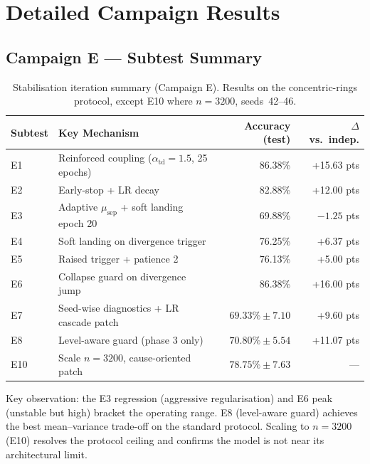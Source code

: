 \documentclass[11pt,a4paper]{article}
\begin{document}
\appendix

\section{Detailed Campaign Results}

\subsection{Campaign E --- Subtest Summary}

\begin{table}[h]
\centering
\begin{tabular}{llrr}
\toprule
\textbf{Subtest} & \textbf{Key Mechanism} & \textbf{Accuracy (test)} & \textbf{$\Delta$ vs.\ indep.} \\
\midrule
E1  & Reinforced coupling ($\alpha_{\mathrm{td}}=1.5$, 25 epochs)  & 86.38\%       & +15.63 pts \\
E2  & Early-stop + LR decay                                         & 82.88\%       & +12.00 pts \\
E3  & Adaptive $\mu_{\mathrm{sep}}$ + soft landing epoch 20         & 69.88\%       & $-1.25$ pts \\
E4  & Soft landing on divergence trigger                            & 76.25\%       & +6.37 pts  \\
E5  & Raised trigger + patience 2                                   & 76.13\%       & +5.00 pts  \\
E6  & Collapse guard on divergence jump                             & 86.38\%       & +16.00 pts \\
E7  & Seed-wise diagnostics + LR cascade patch                      & $69.33\% \pm 7.10$ & +9.60 pts \\
E8  & Level-aware guard (phase 3 only)                              & $70.80\% \pm 5.54$ & +11.07 pts \\
E10 & Scale $n=3200$, cause-oriented patch                          & $78.75\% \pm 7.63$ & --- \\
\bottomrule
\end{tabular}
\caption{Stabilisation iteration summary (Campaign E).  Results on the concentric-rings protocol,
except E10 where $n=3200$, seeds~42--46.}
\label{tab:campaign_e_detail}
\end{table}

Key observation: the E3 regression (aggressive regularisation) and E6 peak (unstable but high)
bracket the operating range.  E8 (level-aware guard) achieves the best mean--variance trade-off
on the standard protocol.  Scaling to $n=3200$ (E10) resolves the protocol ceiling and confirms
the model is not near its architectural limit.
\end{document}
